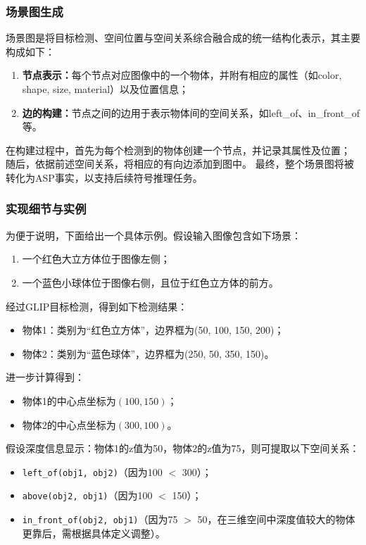\subsubsection{场景图生成}
场景图是将目标检测、空间位置与空间关系综合融合成的统一结构化表示，其主要构成如下： 
\begin{enumerate}[label=(\arabic*),itemsep=0.5em] 
    \item \textbf{节点表示：}每个节点对应图像中的一个物体，并附有相应的属性（如color, shape, size, material）以及位置信息； 
    \item \textbf{边的构建：}节点之间的边用于表示物体间的空间关系，如left\_of、in\_front\_of等。 
\end{enumerate}

在构建过程中，首先为每个检测到的物体创建一个节点，并记录其属性及位置；
随后，依据前述空间关系，将相应的有向边添加到图中。
最终，整个场景图将被转化为ASP事实，以支持后续符号推理任务。
\subsubsection{实现细节与实例}
为便于说明，下面给出一个具体示例。假设输入图像包含如下场景： 
\begin{enumerate}[label=(\arabic*),itemsep=0.5em] 
    \item 一个红色大立方体位于图像左侧； 
    \item 一个蓝色小球体位于图像右侧，且位于红色立方体的前方。 
\end{enumerate}

经过GLIP目标检测，得到如下检测结果： 
\begin{itemize}[leftmargin=2em] 
    \item 物体1：类别为“红色立方体”，边界框为(50, 100, 150, 200)； 
    \item 物体2：类别为“蓝色球体”，边界框为(250, 50, 350, 150)。 
\end{itemize}

进一步计算得到： 
\begin{itemize}[leftmargin=2em] 
    \item 物体1的中心点坐标为$(100,150)$； 
    \item 物体2的中心点坐标为$(300,100)$。 
\end{itemize}

假设深度信息显示：物体1的z值为50，物体2的z值为75，则可提取以下空间关系： 
\begin{itemize}[leftmargin=2em] 
    \item \texttt{left\_of(obj1, obj2)}（因为100 $<$ 300）； 
    \item \texttt{above(obj2, obj1)}（因为100 $<$ 150）； 
    \item \texttt{in\_front\_of(obj2, obj1)}（因为75 $>$ 50，在三维空间中深度值较大的物体更靠后，需根据具体定义调整）。 
\end{itemize}

